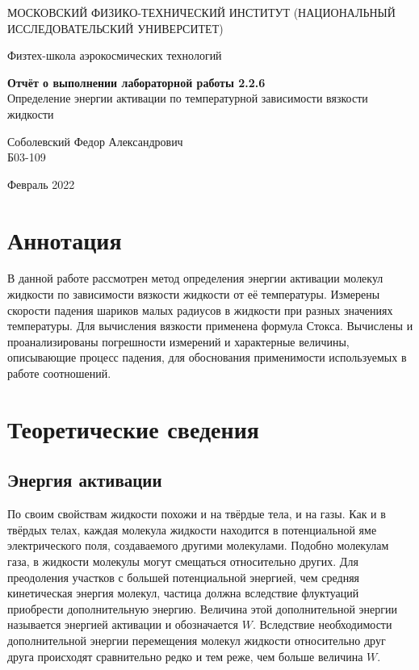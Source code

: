 \documentclass[a4paper,12pt]{article} %
\date{\today}
\begin{document}
\begin{titlepage}
	\begin{center}
		{\large МОСКОВСКИЙ ФИЗИКО-ТЕХНИЧЕСКИЙ ИНСТИТУТ (НАЦИОНАЛЬНЫЙ ИССЛЕДОВАТЕЛЬСКИЙ УНИВЕРСИТЕТ)}
	\end{center}
	\begin{center}
		{\large Физтех-школа аэрокосмических технологий}
	\end{center}
	
	
	\vspace{4.5cm}
	{\huge
		\begin{center}
			{\bf Отчёт о выполнении лабораторной работы 2.2.6}\\
			Определение энергии активации по температурной зависимости вязкости жидкости
		\end{center}
	}
	\vspace{1cm}
	\begin{center}
		{\large Соболевский Федор Александрович \\
			\vspace{0.2cm}
			Б03-109}
	\end{center}
	\vspace{8cm}
	\begin{center}
		Февраль 2022
	\end{center}
\end{titlepage}

\section{Аннотация}

В данной работе рассмотрен метод определения энергии активации молекул жидкости по зависимости вязкости жидкости от её температуры. Измерены скорости падения шариков малых радиусов в жидкости при разных значениях температуры. Для вычисления вязкости применена формула Стокса. Вычислены и проанализированы погрешности измерений и характерные величины, описывающие процесс падения, для обоснования применимости используемых в работе соотношений.

\section{Теоретические сведения}

\subsection{Энергия активации}

По своим свойствам жидкости похожи и на твёрдые тела, и на газы. Как и в твёрдых телах, каждая молекула жидкости находится в потенциальной яме электрического поля, создаваемого другими молекулами. Подобно молекулам газа, в жидкости молекулы могут смещаться относительно других. Для преодоления участков с большей потенциальной энергией, чем средняя кинетическая энергия молекул, частица должна вследствие флуктуаций приобрести дополнительную энергию. Величина этой дополнительной энергии называется энергией активации и обозначается $W$. Вследствие необходимости дополнительной энергии перемещения молекул жидкости относительно друг друга происходят сравнительно редко и тем реже, чем больше величина $W$.
\end{document}
